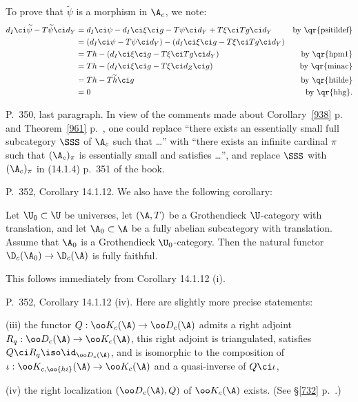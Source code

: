 \documentclass[12pt]{article}
\theoremstyle{remark}
\theoremstyle{definition}
\begin{document}
To prove that $\widetilde\psi$ is a morphism in $\A_c$, we note: 
\begin{align*}
d_I\ci\widetilde\psi-T\widetilde\psi\ci d_Y&=d_I\ci\psi-d_I\ci\xi\ci g-T\psi\ci d_Y+T\xi\ci Tg\ci d_Y&\text{by \qr{psitildef}}\\ 
&=(d_I\ci\psi-T\psi\ci d_Y)-(d_I\ci\xi\ci g-T\xi\ci Tg\ci d_Y)\\ 
&=Th-(d_I\ci\xi\ci g-T\xi\ci Tg\ci d_Y)&\text{by \qr{hpm1}}\\ 
&=Th-(d_I\ci\xi\ci g-T\xi\ci d_Z\ci g)&\text{by \qr{minac}}\\ 
&=Th-T\widetilde h\ci g&\text{by \qr{htilde}}\\ 
&=0&\text{by \qr{hhg}}. 
\end{align*}



\begin{s} 
P.~350, last paragraph. In view of the comments made about Corollary~\ref{938} p.~ and Theorem~\ref{961} p.~, one could replace ``there exists an essentially small full subcategory $\SSS$ of $\A_c$ such that \dots'' with ``there exists an infinite cardinal $\pi$ such that $(\A_c)_\pi$ is essentially small and satisfies \dots'', and replace $\SSS$ with $(\A_c)_\pi$ in (14.1.4) p.~351 of the book.
\end{s}

%

\begin{s}
P.~352, Corollary 14.1.12. We also have the following corollary: 

Let $\U_0\subset\U$ be universes, let $(\A,T)$ be a Grothendieck $\U$-category with translation, and let $\A_0\subset\A$ be a fully abelian subcategory with translation. Assume that $\A_0$ is a Grothendieck $\U_0$-category. Then the natural functor $\D_c(\A_0)\to\D_c(\A)$ is fully faithful.

This follows immediately from Corollary 14.1.12 (i). 
\end{s}

%

\begin{s} 
P.~352, Corollary 14.1.12 (iv). Here are slightly more precise statements:

\nn(iii) the functor $Q:\oo K_c(\A)\to\oo D_c(\A)$ admits a right adjoint $R_q:\oo D_c(\A)\to\oo K_c(\A)$, this right adjoint is triangulated, satisfies $Q\ci R_q\iso\id_{\oo D_c(\A)}$, and is isomorphic to the composition of $\iota:\oo K_{c,\oo{hi}}(\A)\to\oo K_c(\A)$ and a quasi-inverse of $Q\ci\iota$,

\nn(iv) the right localization $(\oo D_c(\A),Q)$ of $\oo K_c(\A)$ exists. %
(See \S\ref{732} p.~.)
\end{s}
\end{document}
